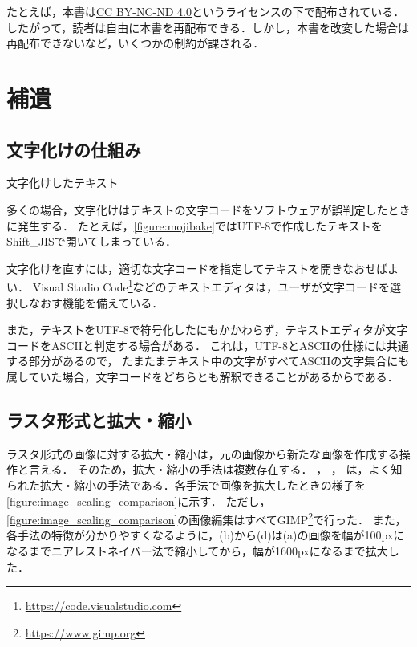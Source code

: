 \documentclass[../../index]{subfiles}
\begin{document}
たとえば，本書は\href{https://creativecommons.org/licenses/by-nc-nd/4.0/deed.ja}{CC BY-NC-ND 4.0}というライセンスの下で配布されている．
したがって，読者は自由に本書を再配布できる．しかし，本書を改変した場合は再配布できないなど，いくつかの制約が課される．

\section{補遺}
\subsection{文字化けの仕組み}
\begin{floatingfigure}{\smallfiguresize}
  \centering
  \caption{文字化けしたテキスト}
  \label{figure:mojibake}
\end{floatingfigure}

多くの場合，文字化けはテキストの文字コードをソフトウェアが誤判定したときに発生する．
たとえば，\cref{figure:mojibake}ではUTF-8で作成したテキストをShift\_JISで開いてしまっている．

文字化けを直すには，適切な文字コードを指定してテキストを開きなおせばよい．
Visual Studio Code\footnote{\url{https://code.visualstudio.com}}などのテキストエディタは，ユーザが文字コードを選択しなおす機能を備えている．

また，テキストをUTF-8で符号化したにもかかわらず，テキストエディタが文字コードをASCIIと判定する場合がある．
これは，UTF-8とASCIIの仕様には共通する部分があるので，
たまたまテキスト中の文字がすべてASCIIの文字集合にも属していた場合，文字コードをどちらとも解釈できることがあるからである．

\subsection{ラスタ形式と拡大・縮小}
\label{subsection:raster_scaling}
ラスタ形式の画像に対する拡大・縮小は，元の画像から新たな画像を作成する操作と言える．
そのため，拡大・縮小の手法は複数存在する．
，
，
は，よく知られた拡大・縮小の手法である．各手法で画像を拡大したときの様子を\cref{figure:image_scaling_comparison}に示す．
ただし，\cref{figure:image_scaling_comparison}の画像編集はすべてGIMP\footnote{\url{https://www.gimp.org}}で行った．
また，各手法の特徴が分かりやすくなるように，(b)から(d)は(a)の画像を幅が100pxになるまでニアレストネイバー法で縮小してから，幅が1600pxになるまで拡大した．
\end{document}
